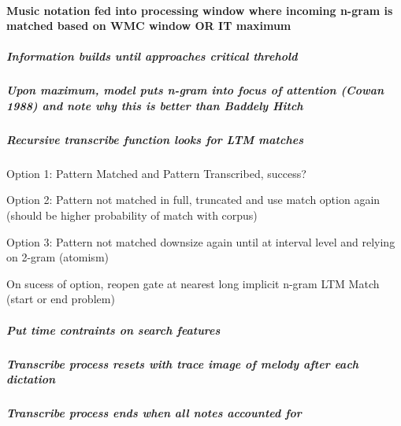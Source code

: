 \documentclass[]{book}
\let\oldparagraph\paragraph
\renewcommand{\paragraph}[1]{\oldparagraph{#1}\mbox{}}
\let\oldsubparagraph\subparagraph
\renewcommand{\subparagraph}[1]{\oldsubparagraph{#1}\mbox{}}
\theoremstyle{definition}
\theoremstyle{definition}
\theoremstyle{definition}
\theoremstyle{remark}
\begin{document}
\hypertarget{music-notation-fed-into-processing-window-where-incoming-n-gram-is-matched-based-on-wmc-window-or-it-maximum}{%
\paragraph{Music notation fed into processing window where incoming
n-gram is matched based on WMC window OR IT
maximum}\label{music-notation-fed-into-processing-window-where-incoming-n-gram-is-matched-based-on-wmc-window-or-it-maximum}}

\hypertarget{information-builds-until-approaches-critical-threhold}{%
\subparagraph{Information builds until approaches critical
threhold}\label{information-builds-until-approaches-critical-threhold}}

\hypertarget{upon-maximum-model-puts-n-gram-into-focus-of-attention-cowan-1988-and-note-why-this-is-better-than-baddely-hitch}{%
\subparagraph{Upon maximum, model puts n-gram into focus of attention
(Cowan 1988) and note why this is better than Baddely
Hitch}\label{upon-maximum-model-puts-n-gram-into-focus-of-attention-cowan-1988-and-note-why-this-is-better-than-baddely-hitch}}

\hypertarget{recursive-transcribe-function-looks-for-ltm-matches}{%
\subparagraph{Recursive transcribe function looks for LTM
matches}\label{recursive-transcribe-function-looks-for-ltm-matches}}

Option 1: Pattern Matched and Pattern Transcribed, success?

Option 2: Pattern not matched in full, truncated and use match option
again (should be higher probability of match with corpus)

Option 3: Pattern not matched downsize again until at interval level and
relying on 2-gram (atomism)

On sucess of option, reopen gate at nearest long implicit n-gram LTM
Match (start or end problem)

\hypertarget{put-time-contraints-on-search-features}{%
\subparagraph{Put time contraints on search
features}\label{put-time-contraints-on-search-features}}

\hypertarget{transcribe-process-resets-with-trace-image-of-melody-after-each-dictation}{%
\subparagraph{Transcribe process resets with trace image of melody after
each
dictation}\label{transcribe-process-resets-with-trace-image-of-melody-after-each-dictation}}

\hypertarget{transcribe-process-ends-when-all-notes-accounted-for}{%
\subparagraph{Transcribe process ends when all notes accounted
for}\label{transcribe-process-ends-when-all-notes-accounted-for}}
\end{document}
